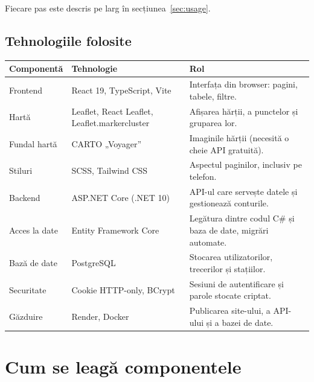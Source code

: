 \documentclass[11pt,a4paper]{article}
\begin{document}
Fiecare pas este descris pe larg în secțiunea~\ref{sec:usage}.

\subsection{Tehnologiile folosite}

\begin{center}
\begin{tabularx}{\textwidth}{@{}l>{\raggedright\arraybackslash}p{4.6cm}>{\raggedright\arraybackslash}X@{}}
\toprule
\textbf{Componentă} & \textbf{Tehnologie} & \textbf{Rol} \\
\midrule
Frontend      & React 19, TypeScript, Vite & Interfața din browser: pagini, tabele, filtre. \\
Hartă         & Leaflet, React Leaflet, Leaflet.markercluster & Afișarea hărții, a punctelor și gruparea lor. \\
Fundal hartă  & CARTO „Voyager” & Imaginile hărții (necesită o cheie API gratuită). \\
Stiluri       & SCSS, Tailwind CSS & Aspectul paginilor, inclusiv pe telefon. \\
Backend       & ASP.NET Core (.NET 10) & API-ul care servește datele și gestionează conturile. \\
Acces la date & Entity Framework Core & Legătura dintre codul C\# și baza de date, migrări automate. \\
Bază de date  & PostgreSQL & Stocarea utilizatorilor, trecerilor și stațiilor. \\
Securitate    & Cookie HTTP-only, BCrypt & Sesiuni de autentificare și parole stocate criptat. \\
Găzduire      & Render, Docker & Publicarea site-ului, a API-ului și a bazei de date. \\
\bottomrule
\end{tabularx}
\end{center}

\section{Cum se leagă componentele}
\end{document}

